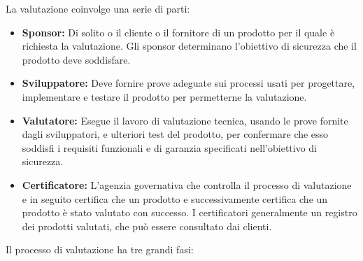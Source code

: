 La valutazione coinvolge una serie di parti:
\begin{itemize}
    \item \textbf{Sponsor:} Di solito o il cliente o il fornitore di un prodotto per il quale è richiesta la valutazione. Gli sponsor determinano l'obiettivo di sicurezza che il prodotto deve soddisfare.

    \item \textbf{Sviluppatore:} Deve fornire prove adeguate sui processi usati per progettare, implementare e testare il prodotto per permetterne la valutazione.

    \item \textbf{Valutatore:} Esegue il lavoro di valutazione tecnica, usando le prove fornite dagli sviluppatori, e ulteriori test del prodotto, per confermare che esso soddisfi i requisiti funzionali e di garanzia specificati nell'obiettivo di sicurezza.

    \item \textbf{Certificatore:} L'agenzia governativa che controlla il processo di valutazione e in seguito certifica che un prodotto e successivamente certifica che un prodotto è stato valutato con successo. I certificatori generalmente un registro dei prodotti valutati, che può essere consultato dai clienti.
\end{itemize}

Il processo di valutazione ha tre grandi fasi:


